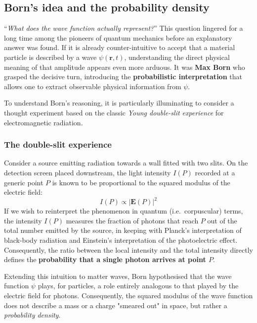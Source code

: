 \subsection{Born's idea and the probability density}
``\emph{What does the wave function actually represent?}'' This question lingered for a long time among the pioneers of quantum mechanics before an explanatory answer was found. If it is already counter-intuitive to accept that a material particle is described by a wave $\psi(\bm{r},t)$, understanding the direct physical meaning of that amplitude appears even more arduous. It was \textbf{Max Born} who grasped the decisive turn, introducing the \textbf{probabilistic interpretation} that allows one to extract observable physical information from $\psi$.

To understand Born's reasoning, it is particularly illuminating to consider a thought experiment based on the classic \emph{Young double-slit experience} for electromagnetic radiation.

\subsubsection{The double-slit experience}
Consider a source emitting radiation towards a wall fitted with two slits. On the detection screen placed downstream, the light intensity $I(P)$ recorded at a generic point $P$ is known to be proportional to the squared modulus of the electric field:
\begin{equation*}
    I(P) \propto |\bm{E}(P)|^2
\end{equation*}
If we wish to reinterpret the phenomenon in quantum (i.e.\ corpuscular) terms, the intensity $I(P)$ measures the fraction of photons that reach $P$ out of the total number emitted by the source, in keeping with Planck's interpretation of black-body radiation and Einstein's interpretation of the photoelectric effect. Consequently, the ratio between the local intensity and the total intensity directly defines the \textbf{probability that a single photon arrives at point $P$}.

Extending this intuition to matter waves, Born hypothesised that the wave function $\psi$ plays, for particles, a role entirely analogous to that played by the electric field for photons. Consequently, the squared modulus of the wave function does not describe a mass or a charge "smeared out" in space, but rather a \textit{probability density}.

